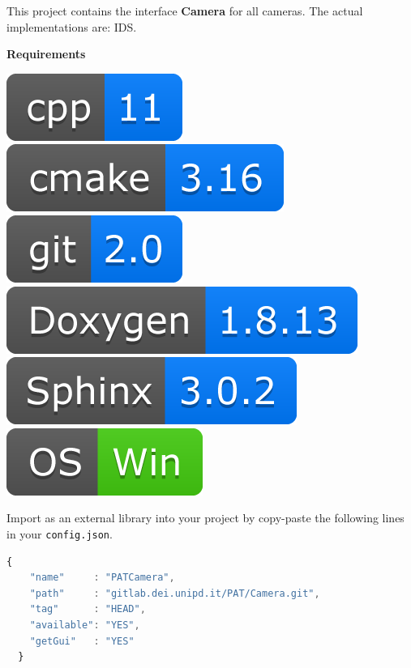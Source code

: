 
This project contains the interface \textbf{Camera} for all cameras. The
actual implementations are: IDS.

\textbf{Requirements}

\includegraphics[scale=0.7]{img/shilds/cpp.png}
\includegraphics[scale=0.7]{img/shilds/cmake.png}
\includegraphics[scale=0.7]{img/shilds/git.png}
\includegraphics[scale=0.7]{img/shilds/doxygen.png}
\includegraphics[scale=0.7]{img/shilds/sphinx.png}
\includegraphics[scale=0.7]{img/shilds/win.png}



Import as an external library into your project by copy-paste the
following lines in your \texttt{config.json}.

\begin{lstlisting}[language=javascript, gobble=2, caption=PATCamera module inclusion.]
  {
    "name"     : "PATCamera",
    "path"     : "gitlab.dei.unipd.it/PAT/Camera.git",
    "tag"      : "HEAD",
    "available": "YES",
    "getGui"   : "YES"
  }
\end{lstlisting}

